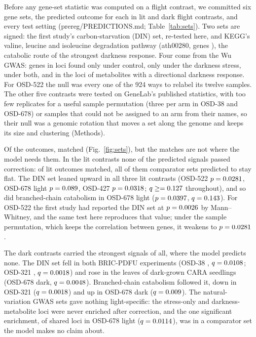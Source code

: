 \documentclass{npjlayout}
\begin{document}
Before any gene-set statistic was computed on a flight contrast, we committed six gene sets, the
predicted outcome for each in lit and dark flight contrasts, and every test setting
(prereg/PREDICTIONS.md; Table~\ref{tab:sets}). Two sets are signed: the first study's
carbon-starvation (DIN) set, re-tested here, and KEGG's valine, leucine and isoleucine degradation
pathway (ath00280, \nSetBcaa{} genes \citep{kanehisa2000,keggrest}), the catabolic route of the strongest darkness response. Four come from
the Wu GWAS: genes in loci found only under control, only under the darkness stress, under both,
and in the loci of metabolites with a directional darkness response. For OSD-522 the null was every
one of the 924 ways to relabel its twelve samples. The other five contrasts were tested on GeneLab's
published statistics, with too few replicates for a useful sample permutation (three per arm in
OSD-38 and OSD-678) or samples that could not be assigned to an arm from their names, so their null
was a genomic rotation that moves a set along the genome and keeps its size and clustering
(Methods).

Of the \nTests{} outcomes, \nMatch{} matched (Fig.~\ref{fig:sets}), but the matches are not where the
model needs them. In the lit contrasts none of the predicted signals passed correction:
\nLitMatch{} of \nLitTests{} lit outcomes matched, all of them comparator sets predicted to stay
flat. The DIN set leaned upward in all three lit contrasts (OSD-522 $p = 0.0281$, OSD-678
light $p = 0.089$, OSD-427 $p = 0.0318$; $q \ge = 0.127$ throughout), and so did
branched-chain catabolism in OSD-678 light ($p = 0.0397$, $q = 0.143$). For OSD-522 the
first study had reported the DIN set at $p = 0.0026$ by Mann--Whitney, and the same test
here reproduces that value; under the sample permutation, which keeps the correlation between
genes, it weakens to $p = 0.0281$.

The dark contrasts carried the strongest signals of all, where the model predicts none. The DIN
set fell in both BRIC-PDFU experiments (OSD-38 \citep{osd38}, $q = 0.0108$; OSD-321
\citep{osd321}, $q = 0.0018$) and rose in the leaves of dark-grown CARA seedlings (OSD-678 dark,
$q = 0.0048$). Branched-chain catabolism followed it, down in OSD-321 ($q = 0.0018$) and up
in OSD-678 dark ($q = 0.009$). The natural-variation GWAS sets gave nothing light-specific: the
stress-only and darkness-metabolite loci were never enriched after correction, and the one
significant enrichment, of shared loci in OSD-678 light ($q = 0.0114$), was in a comparator
set the model makes no claim about.
\end{document}
